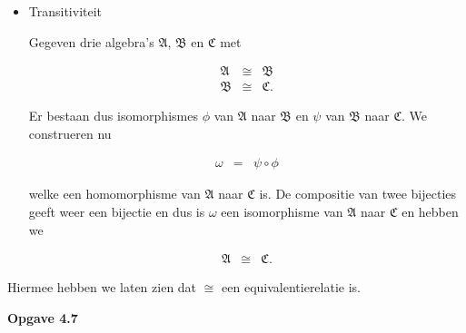 \documentclass[a4paper,11pt]{article}
\begin{document}
\begin{enumerate}
\begin{itemize}
\item{Transitiviteit}

Gegeven drie algebra's $\mathfrak{A}$, $\mathfrak{B}$ en $\mathfrak{C}$ met

\begin{eqnarray*}
\mathfrak{A} & \cong & \mathfrak{B} \\
\mathfrak{B} & \cong & \mathfrak{C}.
\end{eqnarray*}

Er bestaan dus isomorphismes $\phi$ van $\mathfrak{A}$ naar $\mathfrak{B}$ en
$\psi$ van $\mathfrak{B}$ naar $\mathfrak{C}$. We construeren nu

\begin{eqnarray*}
\omega & = & \psi \circ \phi
\end{eqnarray*}

welke een homomorphisme van $\mathfrak{A}$ naar $\mathfrak{C}$ is. De
compositie van twee bijecties geeft weer een bijectie en dus is $\omega$ een
isomorphisme van $\mathfrak{A}$ naar $\mathfrak{C}$ en hebben we

\begin{eqnarray*}
\mathfrak{A} & \cong & \mathfrak{C}.
\end{eqnarray*}

\end{itemize}

Hiermee hebben we laten zien dat $\cong$ een equivalentierelatie is.\\[2em]

\end{enumerate}


{\bf Opgave 4.7}
\end{document}
